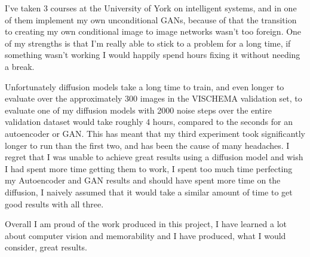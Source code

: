 \documentclass{UoYCSproject}
\begin{document}
I've taken 3 courses at the University of York on intelligent systems, and in one of them implement my own unconditional GANs, because of that the transition to creating my own conditional image to image networks wasn't too foreign. One of my strengths is that I'm really able to stick to a problem for a long time, if something wasn't working I would happily spend hours fixing it without needing a break.  

Unfortunately diffusion models take a long time to train, and even longer to evaluate over the approximately 300 images in the VISCHEMA validation set, to evaluate one of my diffusion models with 2000 noise steps over the entire validation dataset would take roughly 4 hours, compared to the seconds for an autoencoder or GAN. This has meant that my third experiment took significantly longer to run than the first two, and has been the cause of many headaches. I regret that I was unable to achieve great results using a diffusion model and wish I had spent more time getting them to work, I spent too much time perfecting my Autoencoder and GAN results and should have spent more time on the diffusion, I naively assumed that it would take a similar amount of time to get good results with all three.


Overall I am proud of the work produced in this project, I have learned a lot about computer vision and memorability and I have produced, what I would consider, great results.
\end{document}
